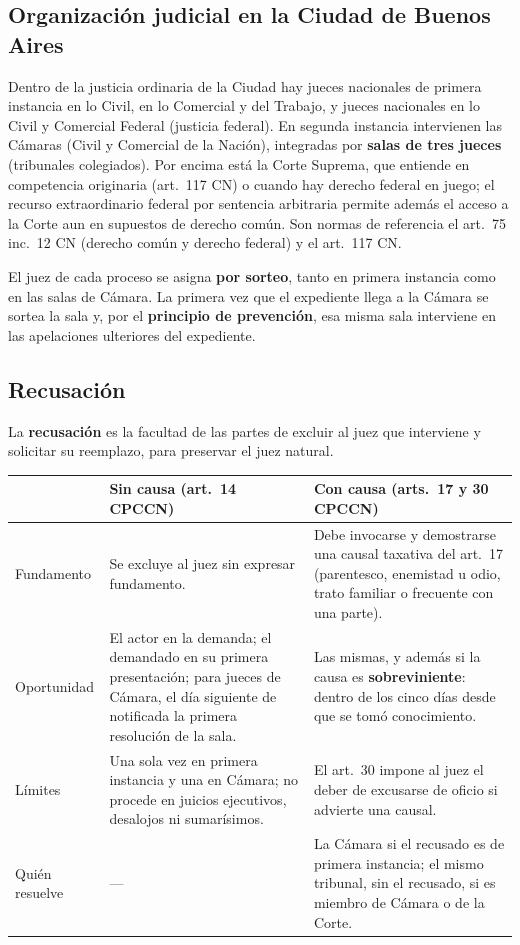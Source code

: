 \documentclass[12pt,oneside]{book}
\renewcommand{\arraystretch}{1.15}
\begin{document}
\subsection{Organización judicial en la Ciudad de Buenos Aires}

Dentro de la justicia ordinaria de la Ciudad hay jueces nacionales de primera instancia en lo Civil, en lo Comercial y del Trabajo, y jueces nacionales en lo Civil y Comercial Federal (justicia federal). En segunda instancia intervienen las Cámaras (Civil y Comercial de la Nación), integradas por \textbf{salas de tres jueces} (tribunales colegiados). Por encima está la Corte Suprema, que entiende en competencia originaria (art.~117 CN) o cuando hay derecho federal en juego; el recurso extraordinario federal por sentencia arbitraria permite además el acceso a la Corte aun en supuestos de derecho común. Son normas de referencia el art.~75 inc.~12 CN (derecho común y derecho federal) y el art.~117 CN.

El juez de cada proceso se asigna \textbf{por sorteo}, tanto en primera instancia como en las salas de Cámara. La primera vez que el expediente llega a la Cámara se sortea la sala y, por el \textbf{principio de prevención}, esa misma sala interviene en las apelaciones ulteriores del expediente.

\subsection{Recusación}

La \textbf{recusación} es la facultad de las partes de excluir al juez que interviene y solicitar su reemplazo, para preservar el juez natural.

\begin{table}[H]
\centering
\renewcommand{\arraystretch}{1.25}
\begin{tabularx}{\textwidth}{>{\RaggedRight\arraybackslash}p{}>{\RaggedRight\arraybackslash}X>{\RaggedRight\arraybackslash}X}
\toprule
 & \textbf{Sin causa (art.~14 CPCCN)} & \textbf{Con causa (arts.~17 y 30 CPCCN)} \\
\midrule
Fundamento & Se excluye al juez sin expresar fundamento. & Debe invocarse y demostrarse una causal taxativa del art.~17 (parentesco, enemistad u odio, trato familiar o frecuente con una parte). \\
\addlinespace
Oportunidad & El actor en la demanda; el demandado en su primera presentación; para jueces de Cámara, el día siguiente de notificada la primera resolución de la sala. & Las mismas, y además si la causa es \textbf{sobreviniente}: dentro de los cinco días desde que se tomó conocimiento. \\
\addlinespace
Límites & Una sola vez en primera instancia y una en Cámara; no procede en juicios ejecutivos, desalojos ni sumarísimos. & El art.~30 impone al juez el deber de excusarse de oficio si advierte una causal. \\
\addlinespace
Quién resuelve & --- & La Cámara si el recusado es de primera instancia; el mismo tribunal, sin el recusado, si es miembro de Cámara o de la Corte. \\
\bottomrule
\end{tabularx}
\end{table}
\end{document}
